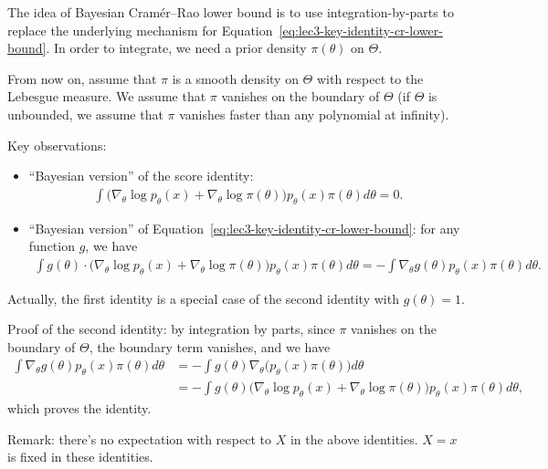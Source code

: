 \documentclass[11pt,letterpaper]{article}
\numberwithin{theorem}{lecture}
\numberwithin{proposition}{lecture}
\numberwithin{lemma}{lecture}
\numberwithin{claim}{lecture}
\numberwithin{corollary}{lecture}
\numberwithin{definition}{lecture}
\numberwithin{conjecture}{lecture}
\numberwithin{remark}{lecture}
\numberwithin{example}{lecture}
\numberwithin{equation}{lecture}
\begin{document}
The idea of Bayesian Cram\'{e}r--Rao lower bound is to use integration-by-parts to replace the underlying mechanism for Equation~\eqref{eq:lec3-key-identity-cr-lower-bound}. In order to integrate, we need a prior density $\pi (\theta)$ on $\Theta$.


From now on, assume that $\pi$ is a smooth density on $\Theta$ with respect to the Lebesgue measure. We assume that $\pi$ vanishes on the boundary of $\Theta$ (if $\Theta$ is unbounded, we assume that $\pi$ vanishes faster than any polynomial at infinity).

Key observations:
\begin{itemize}
  \item ``Bayesian version'' of the score identity:
  \begin{align*}
    \int  \big(\nabla_\theta \log p_\theta (x) + \nabla_\theta \log \pi (\theta) \big) p_\theta (x) \pi (\theta) d\theta = 0.
  \end{align*}
  \item ``Bayesian version'' of Equation~\eqref{eq:lec3-key-identity-cr-lower-bound}: for any function $g$, we have
  \begin{align}
    \int g(\theta) \cdot \big(\nabla_\theta \log p_\theta (x) + \nabla_\theta \log \pi (\theta) \big) p_\theta (x) \pi (\theta) d\theta = - \int \nabla_\theta g (\theta) p_\theta (x) \pi (\theta) d\theta.\label{eq:lec3-key-identity-bayesian-cr-lower-bound}
  \end{align}
\end{itemize}
Actually, the first identity is a special case of the second identity with $g (\theta) = 1$.

Proof of the second identity: by integration by parts, since $\pi$ vanishes on the boundary of $\Theta$, the boundary term vanishes, and we have
\begin{align*}
  \int \nabla_\theta g (\theta) p_\theta (x) \pi (\theta) d\theta
  &= - \int g(\theta) \nabla_\theta \big( p_\theta (x) \pi (\theta) \big) d\theta \\
  &= - \int g(\theta) \big(\nabla_\theta \log p_\theta (x) + \nabla_\theta \log \pi (\theta) \big) p_\theta (x) \pi (\theta) d\theta,
\end{align*}
which proves the identity.

Remark: there's no expectation with respect to $X$ in the above identities. $X = x$ is fixed in these identities.
\end{document}
